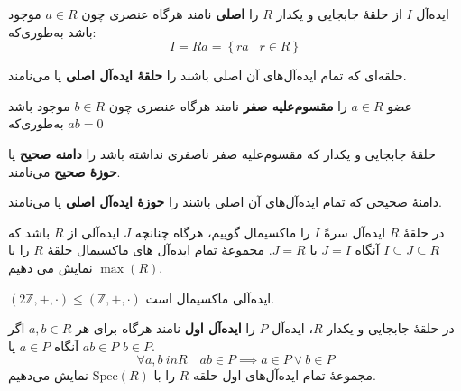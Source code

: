 \begin{definition}
    ایده‌آل $I$  از حلقهٔ جابجایی و یکدار $R$ را \textbf{اصلی} نامند هرگاه عنصری چون $a \in R$ موجود باشد به‌طوری‌که:
    \[
        I = Ra = \left\{ ra \mid r \in R \right\}
    \]
\end{definition}

\begin{definition}
    حلقه‌ای که تمام ایده‌آل‌های آن اصلی باشند را \textbf{حلقهٔ ایده‌آل اصلی} یا   می‌نامند.
\end{definition}

\begin{definition}
    عضو $a \in R$ را \textbf{مقسوم‌علیه صفر} نامند هرگاه عنصری چون $b \in R$ موجود باشد به‌طوری‌که \(ab = 0 \)

\end{definition}

\begin{definition}
    حلقهٔ جابجایی و یکدار که مقسوم‌علیه صفر ناصفری نداشته باشد را \textbf{دامنه صحیح} یا  \textbf{حوزهٔ صحیح} می‌نامند.
\end{definition}

\begin{definition}
    دامنهٔ صحیحی که تمام ایده‌آل‌های آن اصلی باشند را \textbf{حوزهٔ ایده‌آل اصلی} یا   می‌نامند.
\end{definition}

\begin{definition}

    در حلقهٔ
    \(R\)
    ایده‌آل سرهً
    \(I\)
    را ماکسیمال گوییم، هرگاه چنانچه
    \(J\)
    ایده‌آلی از
    \(R\)
    باشد که
    \(I \subseteq J \subseteq R\)
    آنگاه
    \(J = I\)
    یا
    \(J = R\).
    مجموعهٔ تمام ایده‌آل های ماکسیمال حلقهٔ \(R\) را با
    \(\max (R)\)
    نمایش می دهیم.


\end{definition}

\begin{example}
    $(2\mathbb{Z}, +, \cdot) \leqslant (\mathbb{Z}, +, \cdot)$
    ایده‌آلی ماکسیمال است.
\end{example}



\begin{definition}
    در حلقهٔ جابجایی و یکدار $R$، ایده‌آل $P$ را \textbf{ایده‌آل اول} نامند هرگاه برای هر $a,b \in R$ اگر $ab \in P$ آنگاه $a \in P$ یا $b \in P$.
    \[\forall a, b \ in R \quad ab \in P \implies a \in P \lor b \in P\]
    مجموعهٔ تمام ایده‌آل‌های اول حلقه $R$ را با $\mathrm{Spec}(R)$ نمایش می‌دهیم.

\end{definition}


